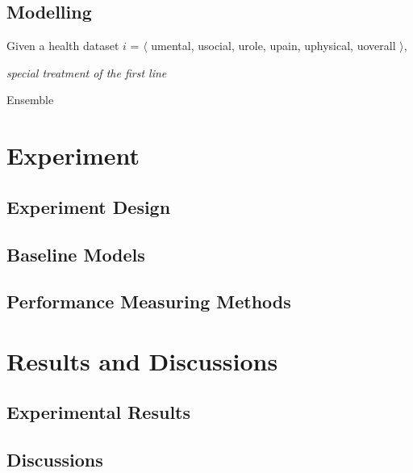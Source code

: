 \documentclass[runningheads]{llncs}
\begin{document}
\subsection{Modelling}
%
Given a health dataset $i$ = $\langle$ u{\tiny{mental}}, u{\tiny{social}}, u{\tiny{role}}, u{\tiny{pain}}, u{\tiny{physical}}, u{\tiny{overall}} $\rangle$, \\
%
%
\IncMargin{1em}
\begin{algorithm}
		\BlankLine
		\emph{special treatment of the first line}\;
	\caption{Ensemble}\label{algo_disjdecomp}
\end{algorithm}
\DecMargin{1em}
%
%
\pagebreak
\section{Experiment}
\subsection{Experiment Design}
\subsection{Baseline Models}
\subsection{Performance Measuring Methods}
%
%
%
\pagebreak
\section{Results and Discussions}
\subsection{Experimental Results}
\subsection{Discussions}
%
%
%
\pagebreak
\end{document}
